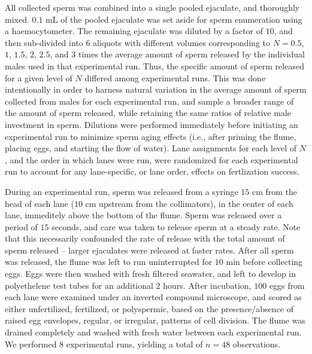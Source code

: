 \documentclass{article}
\begin{document}
	All collected sperm was combined into a single pooled ejaculate, and thoroughly mixed. $0.1$ mL of the pooled ejaculate was set aside for sperm enumeration using a haemocytometer. The remaining ejaculate was diluted by a factor of $10$, and then sub-divided into $6$ aliquots with different volumes corresponding to $N = 0.5$, $1$, $1.5$, $2$, $2.5$, and $3$ times the average amount of sperm released by the individual males used in that experimental run. Thus, the specific amount of sperm released for a given level of $N$ differed among experimental runs. This was done intentionally in order to harness natural variation in the average amount of sperm collected from males for each experimental run, and sample a broader range of the amount of sperm released, while retaining the same ratios of relative male investment in sperm. Dilutions were performed immediately before initiating an experimental run to minimize sperm aging effects (i.e., after priming the flume, placing eggs, and starting the flow of water). Lane assignments for each level of $N$, and the order in which lanes were run, were randomized for each experimental run to account for any lane-specific, or lane order, effects on fertlization success. 

	During an experimental run, sperm was released from a syringe $15$ cm from the head of each lane ($10$ cm upstream from the collimators), in the center of each lane, immeditely above the bottom of the flume. Sperm was released over a period of $15$ seconds, and care was taken to release sperm at a steady rate. Note that this necessarily confounded the rate of release with the total amount of sperm released -- larger ejaculates were released at faster rates. After all sperm was released, the flume was left to run uninterrupted for $10$ min before collecting eggs. Eggs were then washed with fresh filtered seawater, and left to develop in polyethelene test tubes for an additional $2$ hours. After incubation, $100$ eggs from each lane were examined under an inverted compound microscope, and scored as either unfertilized, fertilized, or polyspermic, based on the presence/absence of raised egg envelopes, regular, or irregular, patterns of cell division. The flume was drained completely and washed with fresh water between each experimental run. We performed $8$ experimental runs, yielding a total of $n=48$ observations.
\end{document}
